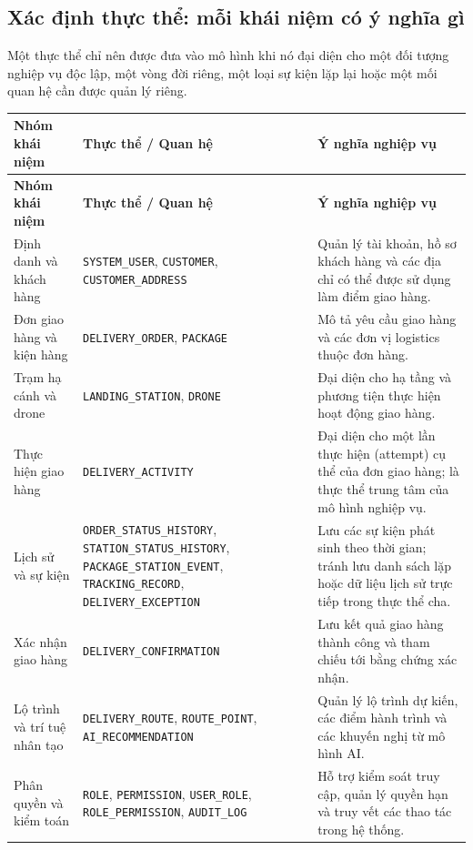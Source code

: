 \subsection{Xác định thực thể: mỗi khái niệm có ý nghĩa gì} Một thực thể chỉ nên được đưa vào mô hình khi nó đại diện cho một đối tượng nghiệp vụ độc lập, một vòng đời riêng, một loại sự kiện lặp lại hoặc một mối quan hệ cần được quản lý riêng. \renewcommand{\arraystretch}{1.15} \small \begin{longtable}{|p{3.5cm}|p{4.5cm}|p{7cm}|} \hline \textbf{Nhóm khái niệm} & \textbf{Thực thể / Quan hệ} & \textbf{Ý nghĩa nghiệp vụ} \\ \hline \endfirsthead \hline \textbf{Nhóm khái niệm} & \textbf{Thực thể / Quan hệ} & \textbf{Ý nghĩa nghiệp vụ} \\ \hline \endhead Định danh và khách hàng & \texttt{SYSTEM\_USER}, \texttt{CUSTOMER}, \texttt{CUSTOMER\_ADDRESS} & Quản lý tài khoản, hồ sơ khách hàng và các địa chỉ có thể được sử dụng làm điểm giao hàng. \\ \hline Đơn giao hàng và kiện hàng & \texttt{DELIVERY\_ORDER}, \texttt{PACKAGE} & Mô tả yêu cầu giao hàng và các đơn vị logistics thuộc đơn hàng. \\ \hline Trạm hạ cánh và drone & \texttt{LANDING\_STATION}, \texttt{DRONE} & Đại diện cho hạ tầng và phương tiện thực hiện hoạt động giao hàng. \\ \hline Thực hiện giao hàng & \texttt{DELIVERY\_ACTIVITY} & Đại diện cho một lần thực hiện (attempt) cụ thể của đơn giao hàng; là thực thể trung tâm của mô hình nghiệp vụ. \\ \hline Lịch sử và sự kiện & \texttt{ORDER\_STATUS\_HISTORY}, \texttt{STATION\_STATUS\_HISTORY}, \texttt{PACKAGE\_STATION\_EVENT}, \texttt{TRACKING\_RECORD}, \texttt{DELIVERY\_EXCEPTION} & Lưu các sự kiện phát sinh theo thời gian; tránh lưu danh sách lặp hoặc dữ liệu lịch sử trực tiếp trong thực thể cha. \\ \hline Xác nhận giao hàng & \texttt{DELIVERY\_CONFIRMATION} & Lưu kết quả giao hàng thành công và tham chiếu tới bằng chứng xác nhận. \\ \hline Lộ trình và trí tuệ nhân tạo & \texttt{DELIVERY\_ROUTE}, \texttt{ROUTE\_POINT}, \texttt{AI\_RECOMMENDATION} & Quản lý lộ trình dự kiến, các điểm hành trình và các khuyến nghị từ mô hình AI. \\ \hline Phân quyền và kiểm toán & \texttt{ROLE}, \texttt{PERMISSION}, \texttt{USER\_ROLE}, \texttt{ROLE\_PERMISSION}, \texttt{AUDIT\_LOG} & Hỗ trợ kiểm soát truy cập, quản lý quyền hạn và truy vết các thao tác trong hệ thống. \\ \hline \end{longtable} \normalsize

